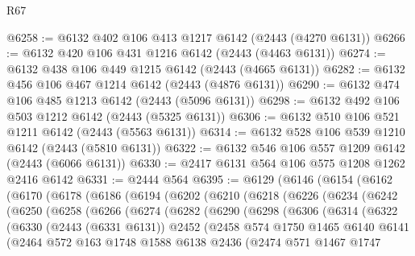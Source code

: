 \begin{lexlean}{R67}
\begin{coremodule}
@6258 := @6132 @402 @106 @413 @1217 @6142 (@2443 (@4270 @6131))
@6266 := @6132 @420 @106 @431 @1216 @6142 (@2443 (@4463 @6131))
@6274 := @6132 @438 @106 @449 @1215 @6142 (@2443 (@4665 @6131))
@6282 := @6132 @456 @106 @467 @1214 @6142 (@2443 (@4876 @6131))
@6290 := @6132 @474 @106 @485 @1213 @6142 (@2443 (@5096 @6131))
@6298 := @6132 @492 @106 @503 @1212 @6142 (@2443 (@5325 @6131))
@6306 := @6132 @510 @106 @521 @1211 @6142 (@2443 (@5563 @6131))
@6314 := @6132 @528 @106 @539 @1210 @6142 (@2443 (@5810 @6131))
@6322 := @6132 @546 @106 @557 @1209 @6142 (@2443 (@6066 @6131))
@6330 := @2417 @6131 @564 @106 @575 @1208 @1262 @2416 @6142
@6331 := @2444 @564
@6395 := @6129
    (@6146
      (@6154
        (@6162
          (@6170
            (@6178
              (@6186
                (@6194
                  (@6202
                    (@6210
                      (@6218
                        (@6226
                          (@6234
                            (@6242
                              (@6250
                                (@6258
                                  (@6266
                                    (@6274
                                      (@6282
                                        (@6290
                                          (@6298
                                            (@6306
                                              (@6314
                                                (@6322
                                                  (@6330
                                                    (@2443 (@6331 @6131))
                                                    @2452
                                                    (@2458
                                                      @574
                                                      @1750
                                                      @1465
                                                      @6140
                                                      @6141
                                                      (@2464
                                                        @572
                                                        @163
                                                        @1748
                                                        @1588
                                                        @6138
                                                        @2436
                                                        (@2474
                                                          @571
                                                          @1467
                                                          @1747

\end{coremodule}
\end{lexlean}
